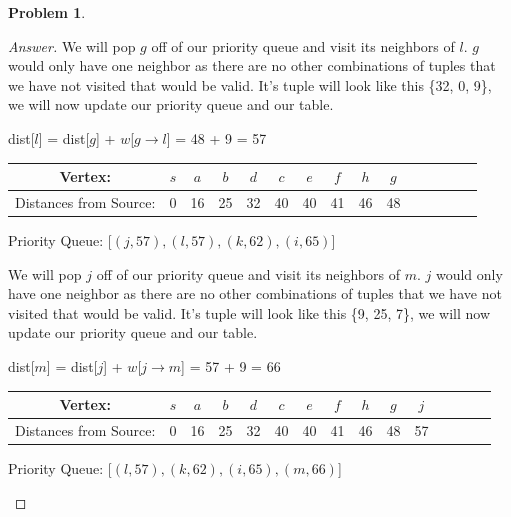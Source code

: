 \documentclass[11pt]{article}
\theoremstyle{definition}
\theoremstyle{definition}
\newtheorem{required}{Problem}
\theoremstyle{definition}
\begin{document}
\begin{required}
\begin{enumerate}[label=(\alph*)]
\begin{proof}[Answer]
We will pop $g$ off of our priority queue and visit its neighbors of $l$. $g$ would only have one neighbor as there are no other combinations of tuples that we have not visited that would be valid. It's tuple will look like this \{32, 0, 9\}, we will now update our priority queue and our table.
\begin{center}
dist[$l$] = dist[$g$]  + $w$[$g \rightarrow l$] = 48 + 9 = 57 \\
\begin{tabular}{ | c | c | c | c | c | c | c | c | c | c | c | c | c | c | c |}
 \hline
 Vertex:& $s$ & $a$ & $b$ & $d$ & $c$ & $e$ & $f$ & $h$ & $g$\\ 
 \hline
 Distances from Source:& 0 & 16 & 25 & 32 & 40 & 40 & 41 & 46 & 48 \\  
 \hline
\end{tabular}
\end{center}
\begin{center}
Priority Queue: [$(j, 57), (l, 57), (k,62), (i, 65)$]
\end{center}

We will pop $j$ off of our priority queue and visit its neighbors of $m$. $j$ would only have one neighbor as there are no other combinations of tuples that we have not visited that would be valid. It's tuple will look like this \{9, 25, 7\}, we will now update our priority queue and our table.
\begin{center}
dist[$m$] = dist[$j$]  + $w$[$j \rightarrow m$] = 57 + 9 = 66 \\
\begin{tabular}{ | c | c | c | c | c | c | c | c | c | c | c | c | c | c | c |}
 \hline
 Vertex:& $s$ & $a$ & $b$ & $d$ & $c$ & $e$ & $f$ & $h$ & $g$ & $j$\\ 
 \hline
 Distances from Source:& 0 & 16 & 25 & 32 & 40 & 40 & 41 & 46 & 48 & 57 \\  
 \hline
\end{tabular}
\end{center}
\begin{center}
Priority Queue: [$(l, 57), (k,62), (i, 65), (m, 66)$]
\end{center}


\end{proof}
\end{enumerate}
\end{required}
\end{document}
